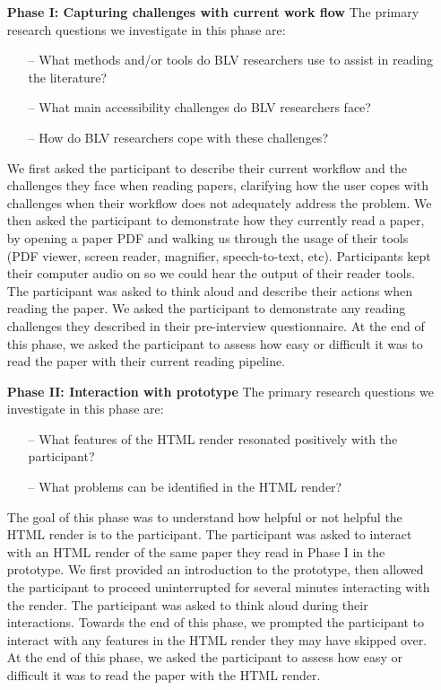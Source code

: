 \begin{itemize}[itemsep=5pt]
    \item[] \textbf{Phase I: Capturing challenges with current work flow} \newline
    The primary research questions we investigate in this phase are: 
    \begin{itemize}[noitemsep, leftmargin=0.4in]
        \item[--] What methods and/or tools do BLV researchers use to assist in reading the literature?
        \item[--] What main accessibility challenges do BLV researchers face?
        \item[--] How do BLV researchers cope with these challenges?
    \end{itemize}
    We first asked the participant to describe their current workflow and the challenges they face when reading papers, clarifying how the user copes with challenges when their workflow does not adequately address the problem. We then asked the participant to demonstrate how they currently read a paper, by opening a paper PDF and walking us through the usage of their tools (PDF viewer, screen reader, magnifier, speech-to-text, etc). Participants kept their computer audio on so we could hear the output of their reader tools. The participant was asked to think aloud and describe their actions when reading the paper. We asked the participant to demonstrate any reading challenges they described in their pre-interview questionnaire. At the end of this phase, we asked the participant to assess how easy or difficult it was to read the paper with their current reading pipeline.
    \item[] \textbf{Phase II: Interaction with prototype} \newline 
    The primary research questions we investigate in this phase are: 
    \begin{itemize}[noitemsep, leftmargin=0.4in]
        \item[--] What features of the HTML render resonated positively with the participant?
        \item[--] What problems can be identified in the HTML render?
    \end{itemize}
    The goal of this phase was to understand how helpful or not helpful the HTML render is to the participant. The participant was asked to interact with an HTML render of the same paper they read in Phase I in the \scially prototype. We first provided an introduction to the prototype, then allowed the participant to proceed uninterrupted for several minutes interacting with the render. The participant was asked to think aloud during their interactions. Towards the end of this phase, we prompted the participant to interact with any features in the HTML render they may have skipped over. At the end of this phase, we asked the participant to assess how easy or difficult it was to read the paper with the HTML render.

\end{itemize}
